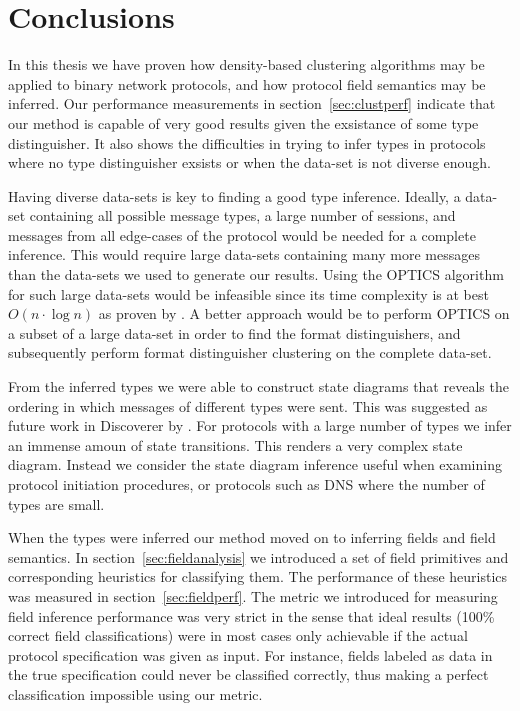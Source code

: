 \documentclass[a4paper]{report}
\begin{document}
\section{Conclusions}
In this thesis we have proven how density-based clustering algorithms may be
applied to binary network protocols, and how protocol field semantics may be
inferred. Our performance measurements in section~\ref{sec:clustperf} indicate
that our method is capable of very good results given the exsistance of some
type distinguisher. It also shows the difficulties in trying to infer types
in protocols where no type distinguisher exsists or when the data-set is
not diverse enough. 

Having diverse data-sets is key to finding a good type inference. Ideally, a
data-set containing all possible message types, a large number of sessions,
and messages from all edge-cases of the protocol would be needed for a
complete inference. This would require large data-sets containing many more
messages than the data-sets we used to generate our results. Using the OPTICS
algorithm for such large data-sets would be infeasible since its time
complexity is at best $O(n \cdot \log n)$ as proven by \citet{ankerst99}.
A better approach would be to perform OPTICS on a subset of a large data-set
in order to find the format distinguishers, and subsequently perform
format distinguisher clustering on the complete data-set.

From the inferred types we were able to construct state diagrams that reveals
the ordering in which messages of different types were sent. This was suggested
as future work in Discoverer by \citet{cui07}. For protocols with a large
number of types we infer an immense amoun of state transitions. This renders
a very complex state diagram. Instead we consider the state diagram inference
useful when examining protocol initiation procedures, or protocols such as
DNS where the number of types are small.

When the types were inferred our method moved on to inferring fields and field
semantics. In section~\ref{sec:fieldanalysis} we introduced a set of
field primitives and corresponding heuristics for classifying them. The
performance of these heuristics was measured in section~\ref{sec:fieldperf}.
The metric we introduced for measuring field inference performance was very
strict in the sense that ideal results (100\% correct field classifications)
were in most cases only achievable if the actual protocol specification was
given as input. For instance, fields labeled as data in the true specification
could never be classified correctly, thus making a perfect classification
impossible using our metric. 
\end{document}
